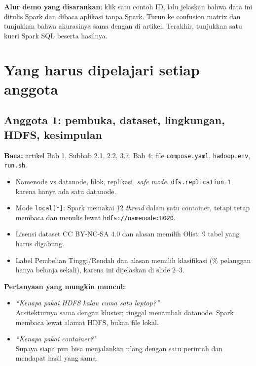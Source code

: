\documentclass[11pt,a4paper]{article}
\newcommand{\f}[1]{\texttt{#1}}
\newcommand{\tanya}[2]{\item \textit{``#1''}\\ #2}
\begin{document}
\textbf{Alur demo yang disarankan}: klik satu contoh ID, lalu jelaskan bahwa data ini
ditulis Spark dan dibaca aplikasi tanpa Spark. Turun ke confusion matrix dan tunjukkan
bahwa akurasinya sama dengan di artikel. Terakhir, tunjukkan satu kueri Spark SQL beserta
hasilnya.

\section{Yang harus dipelajari setiap anggota}

\subsection{Anggota 1: pembuka, dataset, lingkungan, HDFS, kesimpulan}
\textbf{Baca:} artikel Bab 1, Subbab 2.1, 2.2, 3.7, Bab 4; file \f{compose.yaml},
\f{hadoop.env}, \f{run.sh}.
\begin{itemize}
\item Namenode vs datanode, blok, replikasi, \emph{safe mode}. \f{dfs.replication=1}
  karena hanya ada satu datanode.
\item Mode \f{local[*]}: Spark memakai 12 \emph{thread} dalam satu container, tetapi tetap
  membaca dan menulis lewat \f{hdfs://namenode:8020}.
\item Lisensi dataset CC BY-NC-SA 4.0 dan alasan memilih Olist: 9 tabel yang harus
  digabung.
\item Label Pembelian Tinggi/Rendah dan alasan memilih klasifikasi (\oneTimePct\% pelanggan
  hanya belanja sekali), karena ini dijelaskan di slide 2--3.
\end{itemize}
\textbf{Pertanyaan yang mungkin muncul:}
\begin{itemize}
\tanya{Kenapa pakai HDFS kalau cuma satu laptop?}{Arsitekturnya sama dengan kluster;
  tinggal menambah datanode. Spark membaca lewat alamat HDFS, bukan file lokal.}
\tanya{Kenapa pakai container?}{Supaya siapa pun bisa menjalankan ulang dengan satu
  perintah dan mendapat hasil yang sama.}
\end{itemize}
\end{document}
